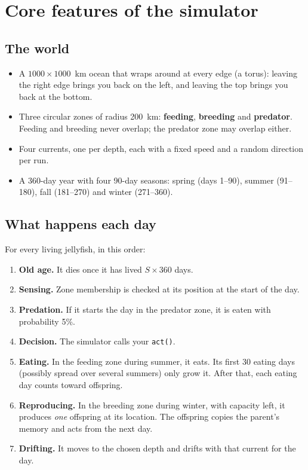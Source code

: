 \documentclass[11pt]{article}
\begin{document}
\section{Core features of the simulator}

\subsection{The world}
\begin{itemize}[leftmargin=*]
  \item A $1000 \times 1000$~km ocean that wraps around at every edge
  (a torus): leaving the right edge brings you back on the left, and
  leaving the top brings you back at the bottom.
  \item Three circular zones of radius 200~km: \textbf{feeding},
  \textbf{breeding} and \textbf{predator}. Feeding and breeding never
  overlap; the predator zone may overlap either.
  \item Four currents, one per depth, each with a fixed speed and a
  random direction per run.
  \item A 360-day year with four 90-day seasons: spring (days 1--90),
  summer (91--180), fall (181--270) and winter (271--360).
\end{itemize}

\subsection{What happens each day}
For every living jellyfish, in this order:
\begin{enumerate}[leftmargin=*]
  \item \textbf{Old age.} It dies once it has lived $S \times 360$ days.
  \item \textbf{Sensing.} Zone membership is checked at its position at
  the start of the day.
  \item \textbf{Predation.} If it starts the day in the predator zone, it
  is eaten with probability 5\%.
  \item \textbf{Decision.} The simulator calls your \texttt{act()}.
  \item \textbf{Eating.} In the feeding zone during summer, it eats. Its
  first 30 eating days (possibly spread over several summers) only grow
  it. After that, each eating day counts toward offspring.
  \item \textbf{Reproducing.} In the breeding zone during winter, with
  capacity left, it produces \emph{one} offspring at its location. The
  offspring copies the parent's memory and acts from the next day.
  \item \textbf{Drifting.} It moves to the chosen depth and drifts with
  that current for the day.
\end{enumerate}
\end{document}
